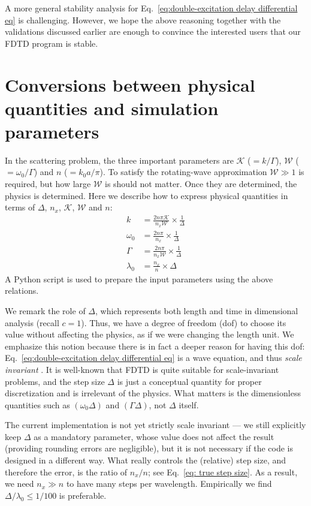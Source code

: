 \documentclass[12pt,letter,onecolumn,notitlepage]{article}
\begin{document}
\begin{appendices}
A more general stability analysis for Eq.~\eqref{eq:double-excitation delay differential eq} is challenging. However, we hope the above reasoning together with the validations discussed earlier are enough to convince the interested users that our FDTD program is stable. 



\section{Conversions between physical quantities and simulation parameters} 
\label{appen: translation}
In the scattering problem, the three important parameters are $\mathcal{K}$ ($=k/\Gamma$), $\mathcal{W}$ ($=\omega_0/\Gamma$) and $n$ ($=k_0a/\pi$). To satisfy the rotating-wave approximation $\mathcal{W}\gg1$ is required, but how large $\mathcal{W}$ is should not matter. Once they are determined, the physics is determined. Here we describe how to express physical quantities in terms of $\Delta$, $n_x$, $\mathcal{K}$, $\mathcal{W}$ and $n$:
\begin{align}
	k&=\frac{2n\pi\mathcal{K}}{n_x\mathcal{W}}\times\frac{1}{\Delta}\\
	\omega_0&=\frac{2n\pi}{n_x}\times\frac{1}{\Delta}\\
	\Gamma&=\frac{2n\pi}{n_x\mathcal{W}}\times\frac{1}{\Delta}\\
	\lambda_0&=\frac{n_x}{n}\times\Delta \label{eq: true step size}
\end{align}
A Python script is used to prepare the input parameters using the above relations. 

We remark the role of $\Delta$, which represents both length and time in dimensional analysis (recall $c=1$). Thus, we have a degree of freedom (dof) to choose its value without affecting the physics, as if we were changing the length unit. We emphasize this notion because 
there is in fact a deeper reason for having this dof: Eq.~\eqref{eq:double-excitation delay differential eq} is a wave equation, and thus \textit{scale invariant} \cite{PhotonicCrystalBook}. It is well-known that FDTD is quite suitable for scale-invariant problems, and the step size $\Delta$ is just a conceptual quantity for proper discretization and is irrelevant of the physics. 
What matters is the dimensionless quantities such as $(\omega_0\Delta)$ and $(\Gamma\Delta)$, not $\Delta$ itself. 

The current implementation is not yet strictly scale invariant --- we still explicitly keep $\Delta$ as a mandatory parameter, whose value does not affect the result (providing rounding errors are negligible), but it is not necessary if the code is designed in a different way. What really controls the (relative) step size, and therefore the error, is the ratio of $n_x/n$; see Eq.~\eqref{eq: true step size}. As a result, we need $n_x\gg n$ to have many steps per wavelength. Empirically we find $\Delta/\lambda_0\leq1/100$ is preferable.



\end{appendices}
\end{document}
